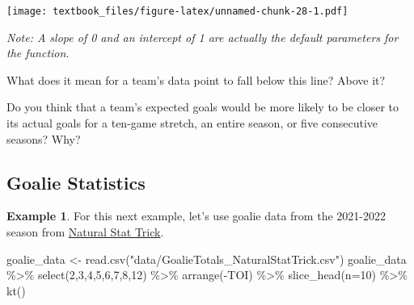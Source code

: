 \documentclass[
  11pt,
]{book}
\newenvironment{Shaded}{\begin{snugshade}}{\end{snugshade}}
\newcommand{\AttributeTok}[1]{\textcolor[rgb]{0.77,0.63,0.00}{#1}}
\newcommand{\DecValTok}[1]{\textcolor[rgb]{0.00,0.00,0.81}{#1}}
\newcommand{\FunctionTok}[1]{\textcolor[rgb]{0.00,0.00,0.00}{#1}}
\newcommand{\NormalTok}[1]{#1}
\newcommand{\OtherTok}[1]{\textcolor[rgb]{0.56,0.35,0.01}{#1}}
\newcommand{\SpecialCharTok}[1]{\textcolor[rgb]{0.00,0.00,0.00}{#1}}
\newcommand{\StringTok}[1]{\textcolor[rgb]{0.31,0.60,0.02}{#1}}
\theoremstyle{definition}
\theoremstyle{definition}
\newtheorem{example}{Example}[chapter]
\theoremstyle{definition}
\theoremstyle{definition}
\theoremstyle{remark}
\begin{document}
\texttt{[image: textbook\_files/figure-latex/unnamed-chunk-28-1.pdf]}

\emph{Note: A slope of 0 and an intercept of 1 are actually the default parameters for the function.}

What does it mean for a team's data point to fall below this line? Above it?

\hfill\break
\hfill\break
\hfill\break
\hfill\break

Do you think that a team's expected goals would be more likely to be closer to its actual goals for a ten-game stretch, an entire season, or five consecutive seasons? Why?

\hfill\break
\hfill\break
\hfill\break
\hfill\break

\hypertarget{goalie-statistics}{%
\subsection{Goalie Statistics}\label{goalie-statistics}}

\begin{example}
For this next example, let's use goalie data from the 2021-2022 season from \href{https://www.naturalstattrick.com/}{Natural Stat Trick}.
\end{example}

\begin{Shaded}
\begin{Highlighting}[]
\NormalTok{goalie\_data }\OtherTok{\textless{}{-}} \FunctionTok{read.csv}\NormalTok{(}\StringTok{"data/GoalieTotals\_NaturalStatTrick.csv"}\NormalTok{)}
\NormalTok{goalie\_data }\SpecialCharTok{\%\textgreater{}\%} 
  \FunctionTok{select}\NormalTok{(}\DecValTok{2}\NormalTok{,}\DecValTok{3}\NormalTok{,}\DecValTok{4}\NormalTok{,}\DecValTok{5}\NormalTok{,}\DecValTok{6}\NormalTok{,}\DecValTok{7}\NormalTok{,}\DecValTok{8}\NormalTok{,}\DecValTok{12}\NormalTok{) }\SpecialCharTok{\%\textgreater{}\%} 
  \FunctionTok{arrange}\NormalTok{(}\SpecialCharTok{{-}}\NormalTok{TOI) }\SpecialCharTok{\%\textgreater{}\%} 
  \FunctionTok{slice\_head}\NormalTok{(}\AttributeTok{n=}\DecValTok{10}\NormalTok{) }\SpecialCharTok{\%\textgreater{}\%} 
  \FunctionTok{kt}\NormalTok{()}
\end{Highlighting}
\end{Shaded}
\end{document}
